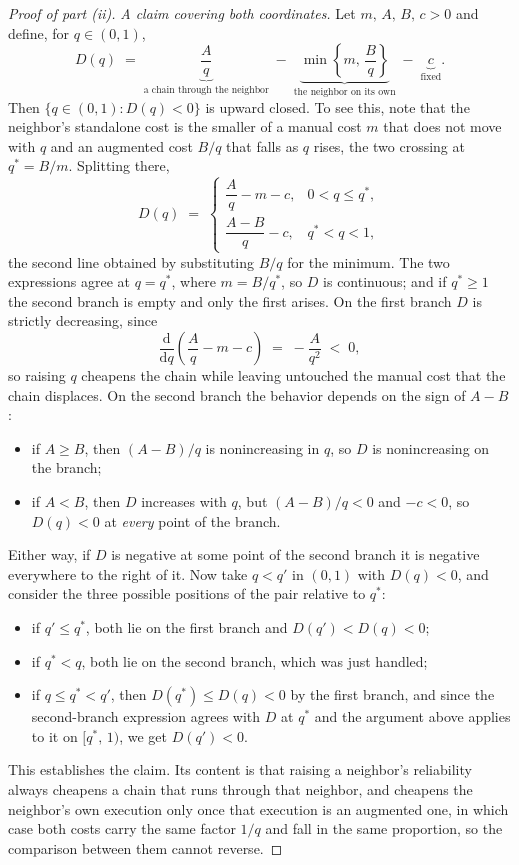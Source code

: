 \begin{proof}[Proof of part (ii)]
\emph{A claim covering both coordinates.}
Let $m,\, A,\, B,\, c > 0$ and define, for $q \in (0,1)$,
\[ D(q) \;=\; \underbrace{\frac{A}{q}}_{\text{a chain through the neighbor}} \;-\; \underbrace{\min\left\{ m,\, \frac{B}{q} \right\}}_{\text{the neighbor on its own}} \;-\; \underbrace{c}_{\text{fixed}} . \]
Then $\{ q \in (0,1) : D(q) < 0 \}$ is upward closed.
To see this, note that the neighbor's standalone cost is the smaller of a manual cost $m$ that does not move with $q$ and an augmented cost $B/q$ that falls as $q$ rises, the two crossing at $q^{*} = B/m$.
Splitting there,
\[
D(q) \;=\;
\begin{cases}
\dfrac{A}{q} - m - c, & 0 < q \leq q^{*}, \\[2.2ex]
\dfrac{A - B}{q} - c, & q^{*} < q < 1,
\end{cases}
\]
the second line obtained by substituting $B/q$ for the minimum.
The two expressions agree at $q = q^{*}$, where $m = B/q^{*}$, so $D$ is continuous; and if $q^{*} \geq 1$ the second branch is empty and only the first arises.
On the first branch $D$ is strictly decreasing, since
\[ \frac{\mathrm{d}}{\mathrm{d}q}\left( \frac{A}{q} - m - c \right) \;=\; -\frac{A}{q^{2}} \;<\; 0 , \]
so raising $q$ cheapens the chain while leaving untouched the manual cost that the chain displaces.
On the second branch the behavior depends on the sign of $A - B$:
\begin{itemize}
\item if $A \geq B$, then $(A-B)/q$ is nonincreasing in $q$, so $D$ is nonincreasing on the branch;
\item if $A < B$, then $D$ increases with $q$, but $(A-B)/q < 0$ and $-c < 0$, so $D(q) < 0$ at \emph{every} point of the branch.
\end{itemize}
Either way, if $D$ is negative at some point of the second branch it is negative everywhere to the right of it.
Now take $q < q'$ in $(0,1)$ with $D(q) < 0$, and consider the three possible positions of the pair relative to $q^{*}$:
\begin{itemize}[itemsep=0pt, parsep=0pt]
\item if $q' \leq q^{*}$, both lie on the first branch and $D(q') < D(q) < 0$;
\item if $q^{*} < q$, both lie on the second branch, which was just handled;
\item if $q \leq q^{*} < q'$, then $D(q^{*}) \leq D(q) < 0$ by the first branch, and since the second-branch expression agrees with $D$ at $q^{*}$ and the argument above applies to it on $[q^{*},\, 1)$, we get $D(q') < 0$.
\end{itemize}
This establishes the claim.
Its content is that raising a neighbor's reliability always cheapens a chain that runs through that neighbor, and cheapens the neighbor's own execution only once that execution is an augmented one, in which case both costs carry the same factor $1/q$ and fall in the same proportion, so the comparison between them cannot reverse.


\end{proof}
